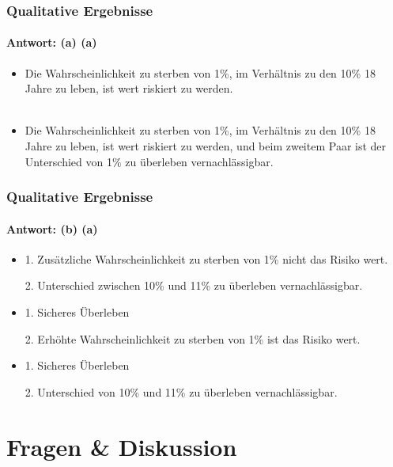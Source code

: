 \documentclass{beamer}
\begin{document}
\begin{frame}
  \frametitle{Qualitative Ergebnisse}
  \framesubtitle{Antwort: (a) (a)}
  \begin{itemize}
  \item<1> Die Wahrscheinlichkeit zu sterben von 1\%, im Verhältnis zu den 10\% 18 Jahre zu leben, ist wert riskiert zu werden.\\~\\
  \item<2> Die Wahrscheinlichkeit zu sterben von 1\%, im Verhältnis zu den 10\% 18 Jahre zu leben, ist wert riskiert zu werden, und beim zweitem Paar ist der Unterschied von 1\% zu überleben vernachlässigbar.
  \end{itemize}
\end{frame}

\begin{frame}
  \frametitle{Qualitative Ergebnisse}
  \framesubtitle{Antwort: (b) (a)}
  \begin{itemize}
  \item<1> 1. Zus\"atzliche Wahrscheinlichkeit zu sterben von 1\% nicht das Risiko wert.
    
    2. Unterschied zwischen 10\% und 11\% zu überleben vernachlässigbar.

  \item<2> 1. Sicheres Überleben

    2. Erhöhte Wahrscheinlichkeit zu sterben von 1\% ist das Risiko wert.

  \item<3> 1. Sicheres \"Uberleben

    2. Unterschied von 10\% und 11\% zu überleben vernachlässigbar. 
  \end{itemize}
\end{frame}

\section{Fragen \& Diskussion}
\end{document}
